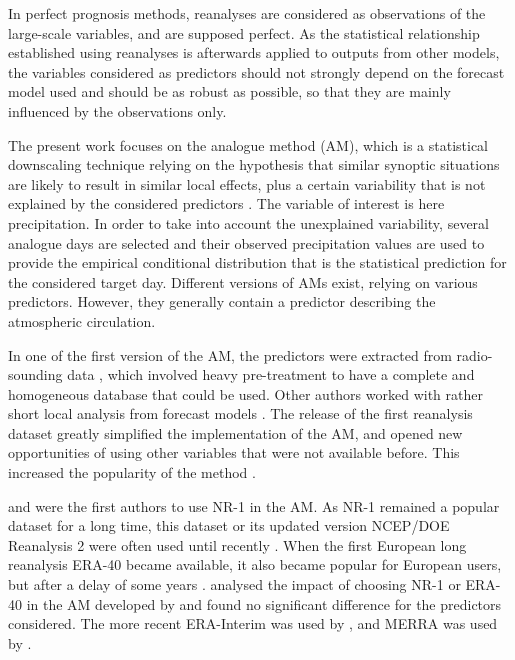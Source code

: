 \documentclass{ametsoc}
\begin{document}
In perfect prognosis methods, reanalyses are considered as observations of the large-scale variables, and are supposed perfect. As the statistical relationship established using reanalyses is afterwards applied to outputs from other models, the variables considered as predictors should not strongly depend on the forecast model used and should be as robust as possible, so that they are mainly influenced by the observations only.

The present work focuses on the analogue method (AM), which is a statistical downscaling technique relying on the hypothesis that similar synoptic situations are likely to result in similar local effects, plus a certain variability that is not explained by the considered predictors \citep{Lorenz1969}. The variable of interest is here precipitation. In order to take into account the unexplained variability, several analogue days are selected and their observed precipitation values are used to provide the empirical conditional distribution that is the statistical prediction for the considered target day. Different versions of AMs exist, relying on various predictors. However, they generally contain a predictor describing the atmospheric circulation.

In one of the first version of the AM, the predictors were extracted from radio-sounding data \citep{Duband1981}, which involved heavy pre-treatment to have a complete and homogeneous database that could be used. Other authors worked with rather short local analysis from forecast models \cite[for example][]{Kruizinga1983, VandenDool1989}. The release of the first reanalysis dataset \citep[NCEP/NCAR Reanalysis I, NR-1,][]{Kalnay1996, Kistler2001} greatly simplified the implementation of the AM, and opened new opportunities of using other variables that were not available before. This increased the popularity of the method \citep{Timbal2008a}.

\citet{Timbal2003} and \citet{Bontron2004} were the first authors to use NR-1 in the AM. As NR-1 remained a popular dataset for a long time, this dataset or its updated version NCEP/DOE Reanalysis 2 \citep[NR-2,][]{Kanamitsu2002} were often used until recently \citep{Wetterhall2005a, Gangopadhyay2005, Altava-Ortiz2006, Barrera2007, Cannon2007, Matulla2007, Bliefernicht2007, Maurer2008, Wu2012, Marty2012, Teng2012, Horton2012, Yiou2014}. When the first European long reanalysis ERA-40 \citep{Uppala2005} became available, it also became popular for European users, but after a delay of some years \citep {Willems2011b, JakobThemessl2011a, BenDaoud2011, Turco2011a, Franke2011, Pascual2012b, Schenk2012, Ribalaygua2013a, Osca2013, Radanovics2013, Martin2014b, Chardon2014, BenDaoud2016}. \citet{BenDaoud2009} analysed the impact of choosing NR-1 or ERA-40 in the AM developed by \citet{Bontron2004} and found no significant difference for the predictors considered. The more recent ERA-Interim \citep[ERA-INT, ][]{Dee2011a} was used by \cite{Raynaud2016b}, and MERRA \citep{Rienecker2011} was used by \citet{Vanvyve2015}.
\end{document}
